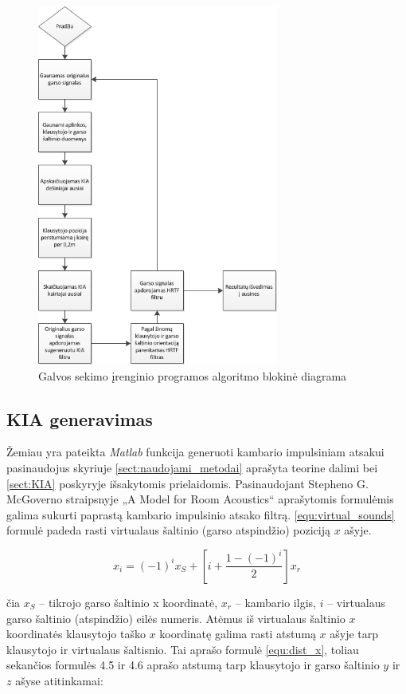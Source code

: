 \documentclass[]{vgtuef}
\begin{document}
\begin{figure}[!ht]
  \centering
  \includegraphics[width=300px]{img/binaural_schem.png}
  \caption{Galvos sekimo įrenginio programos algoritmo blokinė diagrama}
  \label{fig:binaural_schem}
\end{figure}

\subsection{KIA generavimas}

Žemiau yra pateikta \textit{Matlab} funkcija generuoti kambario impulsiniam atsakui pasinaudojus skyriuje \ref{sect:naudojami_metodai} aprašyta teorine dalimi bei \ref{sect:KIA} poskyryje išsakytomis prielaidomis.
Pasinaudojant Stepheno G. McGoverno straipsnyje „A Model for Room Acoustics“ aprašytomis formulėmis galima sukurti paprastą kambario impulsinio atsako filtrą.
\ref{equ:virtual_sounds} formulė padeda rasti virtualaus šaltinio (garso atspindžio) poziciją $x$ ašyje. 

\begin{equation}
x_{i}=(-1)^{i}x_{S}+\left[ i+\frac{1-(-1)^{i}}{2}\right] x_{r}
\label{equ:virtual_sounds}
\end{equation}

čia $x_{S}$ – tikrojo garso šaltinio x koordinatė, $x_{r}$ – kambario ilgis, $i$ – virtualaus garso šaltinio (atspindžio) eilės numeris. Atėmus iš virtualaus šaltinio $x$ koordinatės klausytojo taško $x$ koordinatę galima rasti atstumą $x$ ašyje tarp klausytojo ir virtualaus šaltisnio. Tai aprašo formulė \ref{equ:dist_x}, toliau sekančios formulės 4.5 ir 4.6 aprašo atstumą tarp klausytojo ir garso šaltinio $y$ ir $z$ ašyse atitinkamai:
\end{document}
